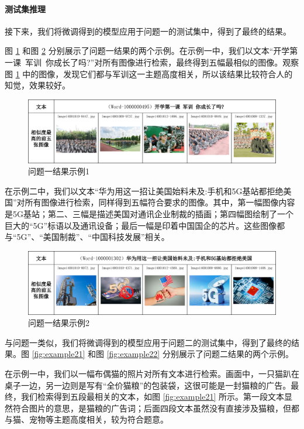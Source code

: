 \documentclass[a4paper]{zreport}
\begin{document}
\paragraph{测试集推理}
接下来，我们将微调得到的模型应用于问题一的测试集中，得到了最终的结果。

图 \ref{fig:example11} 和图 \ref{fig:example12} 分别展示了问题一结果的两个示例。在示例一中，我们以文本“开学第一课~军训~你成长了吗?”对所有图像进行检索，最终得到五幅最相似的图像。观察图 \ref{fig:example11} 中的图像，发现它们都与军训这一主题高度相关，所以该结果比较符合人的知觉，效果较好。

\begin{figure}[h!]
\centering
\includegraphics[width=1.\linewidth]{figures/example11}
\caption{问题一结果示例1}
\label{fig:example11}
\end{figure}

在示例二中，我们以文本“华为用这一招让美国始料未及:手机和5G基站都拒绝美国”对所有图像进行检索，同样得到五幅符合要求的图像。其中，第一幅图像内容是5G基站；第二、三幅是描述美国对通讯企业制裁的插画；第四幅图绘制了一个巨大的“5G”标语以及通讯设备；最后一幅是印着中国国企的芯片。这些图像都与“5G”、“美国制裁”、“中国科技发展”相关。

\begin{figure}[h!]
\centering
\includegraphics[width=1.\linewidth]{figures/example12}
\caption{问题一结果示例2}
\label{fig:example12}
\end{figure}


与问题一类似，我们将微调得到的模型应用于问题二的测试集中，得到了最终的结果。图 \ref{fig:example21} 和图 \ref{fig:example22} 分别展示了问题二结果的两个示例。

在示例一中，我们以一幅布偶猫的照片对所有文本进行检索。画面中，一只猫趴在桌子一边，另一边则是写有“全价猫粮”的包装袋，这很可能是一封猫粮的广告。最终，我们检索得到五段最相关的文本，如图 \ref{fig:example21} 所示。第一段文本显然符合图片的意思，是猫粮的广告词；后面四段文本虽然没有直接涉及猫粮，但都与猫、宠物等主题高度相关，较为符合题意。
\end{document}
